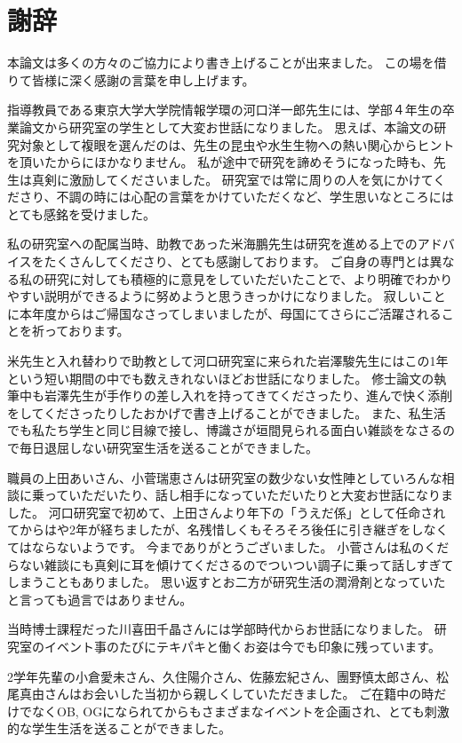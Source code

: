 \chapter*{謝辞}

本論文は多くの方々のご協力により書き上げることが出来ました。
この場を借りて皆様に深く感謝の言葉を申し上げます。

指導教員である東京大学大学院情報学環の河口洋一郎先生には、学部４年生の卒業論文から研究室の学生として大変お世話になりました。
思えば、本論文の研究対象として複眼を選んだのは、先生の昆虫や水生生物への熱い関心からヒントを頂いたからにほかなりません。
私が途中で研究を諦めそうになった時も、先生は真剣に激励してくださいました。
研究室では常に周りの人を気にかけてくださり、不調の時には心配の言葉をかけていただくなど、学生思いなところにはとても感銘を受けました。

私の研究室への配属当時、助教であった米海鵬先生は研究を進める上でのアドバイスをたくさんしてくださり、とても感謝しております。
ご自身の専門とは異なる私の研究に対しても積極的に意見をしていただいたことで、より明確でわかりやすい説明ができるように努めようと思うきっかけになりました。
寂しいことに本年度からはご帰国なさってしまいましたが、母国にてさらにご活躍されることを祈っております。

米先生と入れ替わりで助教として河口研究室に来られた岩澤駿先生にはこの1年という短い期間の中でも数えきれないほどお世話になりました。
修士論文の執筆中も岩澤先生が手作りの差し入れを持ってきてくださったり、進んで快く添削をしてくださったりしたおかげで書き上げることができました。
また、私生活でも私たち学生と同じ目線で接し、博識さが垣間見られる面白い雑談をなさるので毎日退屈しない研究室生活を送ることができました。

職員の上田あいさん、小菅瑞恵さんは研究室の数少ない女性陣としていろんな相談に乗っていただいたり、話し相手になっていただいたりと大変お世話になりました。
河口研究室で初めて、上田さんより年下の「うえだ係」として任命されてからはや2年が経ちましたが、名残惜しくもそろそろ後任に引き継ぎをしなくてはならないようです。
今までありがとうございました。
小菅さんは私のくだらない雑談にも真剣に耳を傾けてくださるのでついつい調子に乗って話しすぎてしまうこともありました。
思い返すとお二方が研究生活の潤滑剤となっていたと言っても過言ではありません。

当時博士課程だった川喜田千晶さんには学部時代からお世話になりました。
研究室のイベント事のたびにテキパキと働くお姿は今でも印象に残っています。

2学年先輩の小倉愛未さん、久住陽介さん、佐藤宏紀さん、團野慎太郎さん、松尾真由さんはお会いした当初から親しくしていただきました。
ご在籍中の時だけでなくOB, OGになられてからもさまざまなイベントを企画され、とても刺激的な学生生活を送ることができました。

